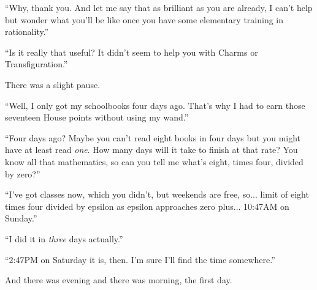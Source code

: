 ``Why, thank you. And let me say that as brilliant as you are already, I can't help but wonder what you'll be like once you have some elementary training in rationality.''

``Is it really that useful? It didn't seem to help you with Charms or Transfiguration.''

There was a slight pause.

``Well, I only got my schoolbooks four days ago. That's why I had to earn those seventeen House points without using my wand.''

``Four days ago? Maybe you can't read eight books in four days but you might have at least read \emph{one}. How many days will it take to finish at that rate? You know all that mathematics, so can you tell me what's eight, times four, divided by zero?''

``I've got classes now, which you didn't, but weekends are free, so... limit of eight times four divided by epsilon as epsilon approaches zero plus... 10:47AM on Sunday.''

``I did it in \emph{three} days actually.''

``2:47PM on Saturday it is, then. I'm sure I'll find the time somewhere.''

And there was evening and there was morning, the first day.
